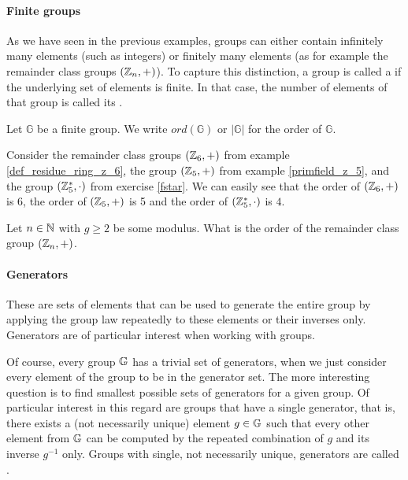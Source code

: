 \paragraph{Finite groups} As we have seen in the previous examples, groups can either contain infinitely many elements (such as integers) or finitely many elements (as for example the remainder class groups $(\mathbb{Z}_n,+)$). To capture this distinction, a group is called a  if the underlying set of elements is finite. In that case, the number of elements of that group is called its .
\begin{notation}
Let $\mathbb{G}$ be a finite group. We write $ord(\mathbb{G})$ or  $|\mathbb{G}|$ for the order of $\mathbb{G}$.
\end{notation}
\begin{example}\label{Zn}
Consider the remainder class groups $(\mathbb{Z}_6,+)$ from example \ref{def_residue_ring_z_6}, the group $(\mathbb{Z}_5,+)$ from example \ref{primfield_z_5}, and the group $(\mathbb{Z}_5^*,\cdot)$ from exercise \ref{fstar}. We can easily see that the order of $(\mathbb{Z}_6,+)$ is $6$, the order of $(\mathbb{Z}_5,+)$ is 5 and the order of $(\mathbb{Z}_5^*,\cdot)$ is $4$.
\end{example}
\begin{exercise}
\label{Zn} Let $n\in\mathbb{N}$ with $g\geq 2$ be some modulus. What is the order of the remainder class group $(\mathbb{Z}_n,+)$.
\end{exercise}
\paragraph{Generators}\label{generators} These are sets of elements that can be used to generate the entire group by applying the group law repeatedly to these elements or their inverses only. Generators are of particular interest when working with groups.

Of course, every group $\mathbb{G}$ has a trivial set of generators, when we just consider every element of the group to be in the generator set. The more interesting question is to find smallest possible sets of generators for a given group. Of particular interest in this regard are groups that have a single generator, that is, there exists a (not necessarily unique) element $g\in\mathbb{G}$ such that every other element from $\mathbb{G}$ can be computed by the repeated combination of $g$ and its inverse $g^{-1}$ only. Groups with single, not necessarily unique, generators are called .\label{cyclic-groups}

